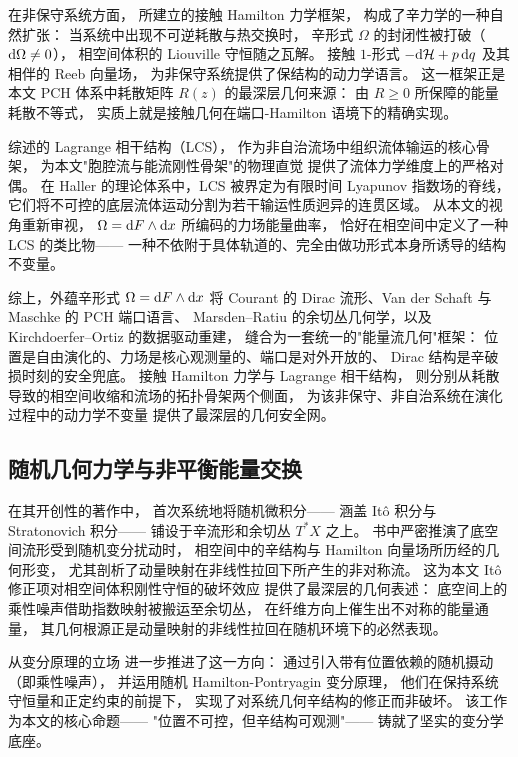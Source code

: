 ﻿\documentclass[10pt,a4paper]{article}
\numberwithin{equation}{section}
\begin{document}
在非保守系统方面，\textcite{BravettiCruzTapias2017} 所建立的接触 Hamilton 力学框架，
构成了辛力学的一种自然扩张：
当系统中出现不可逆耗散与热交换时，
辛形式 $\Omega$ 的封闭性被打破（$\text d\Omega \neq 0$），
相空间体积的 Liouville 守恒随之瓦解。
接触 $1$-形式 $-\text d\mathcal H + p\,\text dq$ 及其相伴的 Reeb 向量场，
为非保守系统提供了保结构的动力学语言。
这一框架正是本文 PCH 体系中耗散矩阵 $R(z)$ 的最深层几何来源：
由 $R \ge 0$ 所保障的能量耗散不等式，
实质上就是接触几何在端口-Hamilton 语境下的精确实现。

\textcite{Haller2015} 综述的 Lagrange 相干结构（LCS），
作为非自治流场中组织流体输运的核心骨架，
为本文"胞腔流与能流刚性骨架"的物理直觉
提供了流体力学维度上的严格对偶。
在 Haller 的理论体系中，LCS 被界定为有限时间 Lyapunov 指数场的脊线，
它们将不可控的底层流体运动分割为若干输运性质迥异的连贯区域。
从本文的视角重新审视，
$\Omega = \text dF \wedge \text dx$ 所编码的力场能量曲率，
恰好在相空间中定义了一种 LCS 的类比物——
一种不依附于具体轨道的、完全由做功形式本身所诱导的结构不变量。

综上，外蕴辛形式 $\Omega = \text dF \wedge \text dx$ 将
Courant 的 Dirac 流形、Van der Schaft 与 Maschke 的 PCH 端口语言、
Marsden--Ratiu 的余切丛几何学，以及 Kirchdoerfer--Ortiz 的数据驱动重建，
缝合为一套统一的"能量流几何"框架：
位置是自由演化的、力场是核心观测量的、端口是对外开放的、
Dirac 结构是辛破损时刻的安全兜底。
接触 Hamilton 力学与 Lagrange 相干结构，
则分别从耗散导致的相空间收缩和流场的拓扑骨架两个侧面，
为该非保守、非自治系统在演化过程中的动力学不变量
提供了最深层的几何安全网。

\subsection{随机几何力学与非平衡能量交换}

\textcite{Bismut1981} 在其开创性的著作中，
首次系统地将随机微积分——
涵盖 It\^{o} 积分与 Stratonovich 积分——
铺设于辛流形和余切丛 $T^*X$ 之上。
书中严密推演了底空间流形受到随机变分扰动时，
相空间中的辛结构与 Hamilton 向量场所历经的几何形变，
尤其剖析了动量映射在非线性拉回下所产生的非对称流。
这为本文 It\^{o} 修正项对相空间体积刚性守恒的破坏效应
提供了最深层的几何表述：
底空间上的乘性噪声借助指数映射被搬运至余切丛，
在纤维方向上催生出不对称的能量通量，
其几何根源正是动量映射的非线性拉回在随机环境下的必然表现。

\textcite{HolmTyranowski2016} 从变分原理的立场
进一步推进了这一方向：
通过引入带有位置依赖的随机摄动（即乘性噪声），
并运用随机 Hamilton-Pontryagin 变分原理，
他们在保持系统守恒量和正定约束的前提下，
实现了对系统几何辛结构的修正而非破坏。
该工作为本文的核心命题——
"位置不可控，但辛结构可观测"——
铸就了坚实的变分学底座。
\end{document}
